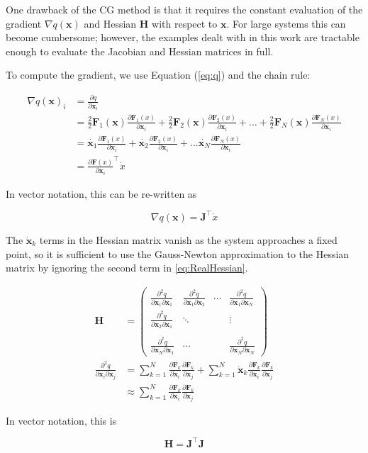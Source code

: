\documentclass{article} %
\newcommand{\bf}[1]{\mathbf{#1}}
\newcommand{\x}{\bf{x}}
\newcommand{\F}{\bf{F}}
\newcommand{\J}{\bf{J}}
\newcommand{\p}{\partial}
\newcommand{\pf}[2]{\frac{\p{#1}}{\p{#2}}}
\newcommand{\ppf}[3]{\frac{\p^2#1}{\p#2\p#3}}
\begin{document}
One drawback of the CG method is that it requires the constant evaluation of the gradient $\nabla q(\x)$ and Hessian $\bf{H}$ with respect to $\x$. For large systems this can become cumbersome; however, the examples dealt with in this work are tractable enough to evaluate the Jacobian and Hessian matrices in full.

To compute the gradient, we use Equation (\ref{eq:q}) and the chain rule:

\begin{align}
  \nabla q(\x)_i &= \pf{q}{\x_i} \\
  &= \frac{2}{2}{\F_1(\x)\pf{\F_1(x)}{\x_i}} + \frac{2}{2}{\F_2(\x)\pf{\F_2(x)}{\x_i}} + ... +
  \frac{2}{2}{\F_N(\x)\pf{\F_N(x)}{\x_i}} \\
  &=\dot{\x_1}\pf{\F_1(x)}{\x_i} +
  \dot{\x_2}\pf{\F_2(x)}{\x_i}+...\dot{\x_N}\pf{\F_N(x)}{\x_i} \\
  &=\pf{\F(x)}{\x_i}^{\intercal}\dot{x}
\end{align}

In vector notation, this can be re-written as

\begin{equation} \label{eq:Jacobian}
  \nabla q(\x) = \J^{\intercal}\dot{x}
\end{equation}

The $\dot{\x}_k$ terms in the Hessian matrix vanish as the system approaches a fixed point, so it is sufficient to use the Gauss-Newton approximation to the Hessian matrix by ignoring the second term in \ref{eq:RealHessian}.

\begin{align}
\bf{H} &= \begin{pmatrix}
\ppf{q}{\x_1}{\x_1} & \ppf{q}{\x_1}{\x_2} & \cdots & \ppf{q}{\x_1}{\x_N} \\
\ppf{q}{\x_2}{\x_1} & \ddots &  & \vdots \\
 &  &  & \\
\ppf{q}{\x_N}{\x_1} & \cdots &  & \ppf{q}{\x_N}{\x_N}
\end{pmatrix} \\
\ppf{q}{\x_i}{\x_j} &= \sum_{k=1}^{N}\pf{\F_k}{\x_i}\pf{\F_k}{\x_j} + \sum_{k=1}^{N}{\dot{\x}_k\pf{\F_k}{\x_i}\pf{\F_k}{\x_j}} \label{eq:RealHessian} \\
&\approx \sum_{k=1}^{N}\pf{\F_k}{\x_i}\pf{\F_k}{\x_j}
\end{align}

In vector notation, this is

\begin{equation} \label{eq:Hessian}
  \bf{H} = \J^{\intercal}\J
\end{equation}
\end{document}
